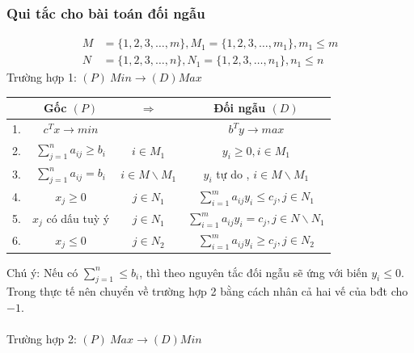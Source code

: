 \documentclass{article}
\begin{document}
\subsubsection{Qui tắc cho bài toán đối ngẫu }
\begin{equation}
    \begin{split}
        M &= \{1,2,3, \ldots , m\} , M_1 = \{ 1,2,3, \ldots , m_1 \} , m_1 \leq m \\
        N &= \{ 1,2,3, \ldots , n\} , N_1 = \{ 1,2,3, \ldots , n_1\} , n_1 \leq n
    \end{split}
\end{equation}
Trường hợp 1: $(P) \: Min \rightarrow (D) Max$ \\
\begin{center}
    \begin{tabular}{|c|c|c|c|}
        \hline
        & Gốc $(P)$ & $\Rightarrow$& Đối ngẫu $(D)$ \\
        \hline
        1. & $c^Tx \rightarrow min$ && $b^Ty \rightarrow max$ \\
        \hline
        2. &  $\sum_{j=1}^n a_{ij} \geq b_i$ & $i \in M_1$ & $y_i \geq  0 , i \in M_1$ \\
        \hline
        3. & $\sum_{j=1}^n a_{ij} = b_i$ & $i \in M \backslash M_1$ & $y_i$ tự do , $i \in M\backslash M_1$ \\
        \hline
        4. & $x_j \geq 0$ & $j \in N_1$ & $\sum_{i=1}^m a_{ij}y_i \leq c_j , j \in N_1$ \\
        \hline
        5. & $x_j$ có dấu tuỳ ý & $j \in N_1$ & $\sum_{i=1}^m a_{ij} y_i = c_j , j \in N\backslash N_1$ \\
        \hline
        6. & $x_j \leq 0$ & $j \in N_2$ & $\sum_{i=1}^m a_{ij}y_i \geq c_j , j \in N_2$ \\
        \hline
    \end{tabular}
\end{center}
Chú ý: Nếu có $\sum_{j=1}^n \leq b_i$, thì theo nguyên tắc đối ngẫu sẽ ứng với biến $y_i \leq 0$. Trong thực tế nên chuyển về trường hợp 2 bằng cách nhân cả hai vế của bđt cho $-1$. \\
\vspace{20pt}
\\            
Trường hợp 2: $(P) \: Max \rightarrow (D) Min$ \\
\end{document}
